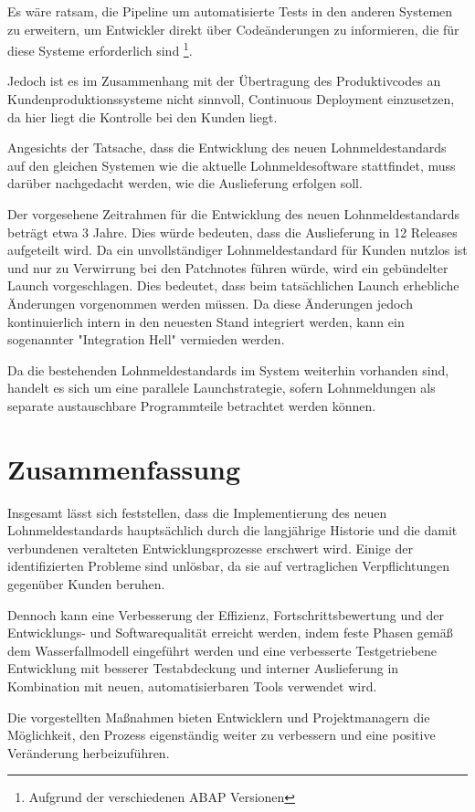 Es wäre ratsam, die Pipeline um automatisierte Tests in den anderen Systemen zu erweitern, um Entwickler direkt über Codeänderungen zu informieren, die für diese Systeme erforderlich sind \footnote{Aufgrund der verschiedenen ABAP Versionen}.

Jedoch ist es im Zusammenhang mit der Übertragung des Produktivcodes an Kundenproduktionssysteme nicht sinnvoll, Continuous Deployment einzusetzen, da hier liegt die Kontrolle bei den Kunden liegt.

Angesichts der Tatsache, dass die Entwicklung des neuen Lohnmeldestandards auf den gleichen Systemen wie die aktuelle Lohnmeldesoftware stattfindet, muss darüber nachgedacht werden, wie die Auslieferung erfolgen soll.

Der vorgesehene Zeitrahmen für die Entwicklung des neuen Lohnmeldestandards beträgt etwa 3 Jahre. Dies würde bedeuten, dass die Auslieferung in 12 Releases aufgeteilt wird. Da ein unvollständiger Lohnmeldestandard für Kunden nutzlos ist und nur zu Verwirrung bei den Patchnotes führen würde, wird ein gebündelter Launch vorgeschlagen. Dies bedeutet, dass beim tatsächlichen Launch erhebliche Änderungen vorgenommen werden müssen. Da diese Änderungen jedoch kontinuierlich intern in den neuesten Stand integriert werden, kann ein sogenannter "Integration Hell" vermieden werden.

Da die bestehenden Lohnmeldestandards im System weiterhin vorhanden sind, handelt es sich um eine parallele Launchstrategie, sofern Lohnmeldungen als separate austauschbare Programmteile betrachtet werden können.

\chapter{Zusammenfassung}

Insgesamt lässt sich feststellen, dass die Implementierung des neuen Lohnmeldestandards hauptsächlich durch die langjährige Historie und die damit verbundenen veralteten Entwicklungsprozesse erschwert wird. Einige der identifizierten Probleme sind unlösbar, da sie auf vertraglichen Verpflichtungen gegenüber Kunden beruhen.

Dennoch kann eine Verbesserung der Effizienz, Fortschrittsbewertung und der Entwicklungs- und Softwarequalität erreicht werden, indem feste Phasen gemäß dem Wasserfallmodell eingeführt werden und eine verbesserte Testgetriebene Entwicklung mit besserer Testabdeckung und interner Auslieferung in Kombination mit neuen, automatisierbaren Tools verwendet wird.

Die vorgestellten Maßnahmen bieten Entwicklern und Projektmanagern die Möglichkeit, den Prozess eigenständig weiter zu verbessern und eine positive Veränderung herbeizuführen.
